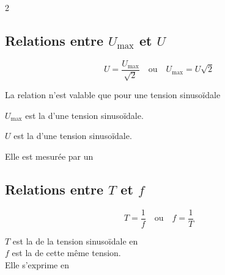 \documentclass[11pt,a4paper]{article}
\begin{document}
\begin{multicols}{2}

\subsection*{Relations entre $U_{\text{max}}$ et $U$}

\begin{equation*}
U = \frac{U_{\text{max}}}{\sqrt{2}} \quad \text{ou} \quad U_{\text{max}} = U \sqrt{2}
\end{equation*}

La relation n'est valable que pour une tension sinusoïdale

\vspace{0.3cm}

$U_{\text{max}}$ est la \underline{\hspace{5.8cm}} d'une tension sinusoïdale.

$U$ est la \underline{\hspace{6cm}} d'une tension sinusoïdale.

Elle est mesurée par un \underline{\hspace{3.8cm}}

\vspace{0.8cm}

\subsection*{Relations entre $T$ et $f$}

\begin{equation*}
T = \frac{1}{f} \quad \text{ou} \quad f = \frac{1}{T}
\end{equation*}

$T$ est la \underline{\hspace{2cm}} de la tension sinusoïdale en \underline{\hspace{2cm}} \\


$f$ est la \underline{\hspace{3cm}} de cette même tension. \\[3mm]

Elle s'exprime en \underline{\hspace{3cm}}

\end{multicols}
\end{document}
